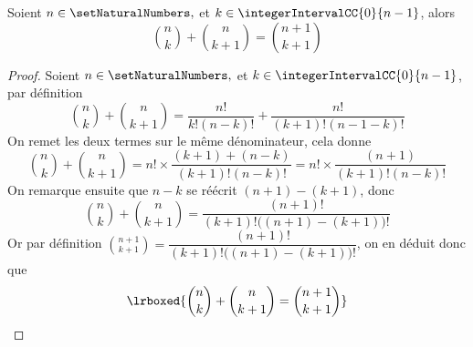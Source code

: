 \begin{property}
\label{binome:pascal}
Soient $n \in \setNaturalNumbers,$ et $k \in \integerIntervalCC{0}{n-1}$, alors 
\[
\binom{n}{k} + \binom{n}{k+1} = \binom{n+1}{k+1}
\]
\end{property}
\begin{proof}
Soient $n \in \setNaturalNumbers,$ et $k \in \integerIntervalCC{0}{n-1}$, par définition\\
\[
\binom{n}{k} + \binom{n}{k+1} 
=\dfrac{n!}{k!(n-k)!} + \dfrac{n!}{(k+1)!(n - 1 -k)!}
\]
On remet les deux termes sur le même dénominateur, cela donne
\[
\binom{n}{k} + \binom{n}{k+1} 
=n!\times \dfrac{(k+1)+(n-k)}{(k+1)!(n-k)!}
=n!\times \dfrac{(n+1)}{(k+1)!(n-k)!}
\]
On remarque ensuite que $n-k$ se réécrit $(n+1)-(k+1)$, donc
\[
\binom{n}{k} + \binom{n}{k+1} =\dfrac{(n+1)!}{(k+1)!\bigl((n+1)-(k+1)\bigr)!}
\]
Or par définition $\displaystyle\binom{n+1}{k+1} = \dfrac{(n+1)!}{(k+1)!\bigl((n+1)-(k+1)\bigr)!}$, on en déduit donc que 
\[
\lrboxed{\displaystyle\binom{n}{k} + \displaystyle\binom{n}{k+1} = \displaystyle\binom{n+1}{k+1}}
\]
\end{proof}